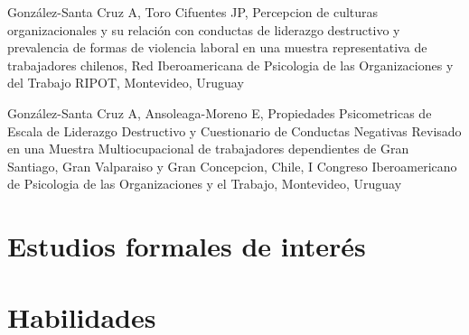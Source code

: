 \documentclass[11pt,a4paper,]{awesome-cv}
\begin{document}
\begin{cventries}
{\begin{cvitems}
\item González-Santa Cruz A, Toro Cifuentes JP, Percepcion de culturas organizacionales y su relación con conductas de liderazgo destructivo y prevalencia de formas de violencia laboral en una muestra representativa de trabajadores chilenos, Red Iberoamericana de Psicologia de las Organizaciones y del Trabajo RIPOT, Montevideo, Uruguay
\item González-Santa Cruz A, Ansoleaga-Moreno E, Propiedades Psicometricas de Escala de Liderazgo Destructivo y Cuestionario de Conductas Negativas Revisado en una Muestra Multiocupacional de trabajadores dependientes de Gran Santiago, Gran Valparaiso y Gran Concepcion, Chile, I Congreso Iberoamericano de Psicologia de las Organizaciones y el Trabajo, Montevideo, Uruguay
\end{cvitems}}
\end{cventries}

\hypertarget{estudios-formales-de-interuxe9s}{%
\section{Estudios formales de
interés}\label{estudios-formales-de-interuxe9s}}

\fontsize{10pt}{1.5em}\color{text}
\begin{cventries}
    \vspace{-4.0mm}
    \vspace{-4.0mm}
    \vspace{-4.0mm}
    \vspace{-4.0mm}
    \vspace{-4.0mm}
\end{cventries}

\hypertarget{habilidades}{%
\section{Habilidades}\label{habilidades}}
\end{document}
